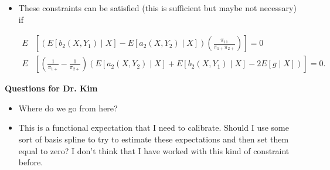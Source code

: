\documentclass[12pt]{article}
\begin{document}
\begin{itemize}
  \item These constraints can be satisfied (this is sufficient but maybe not
    necessary) if 

    \begin{align*}
      E&\left[(E[b_2(X, Y_1) \mid X] - E[a_2(X, Y_2) \mid X])
      \left(\frac{\pi_{11}}{\pi_{1+} \pi_{2+}}\right) \right] = 0\\
      E&\left[\left(\frac{1}{\pi_{1+}} - \frac{1}{\pi_{2+}}\right)(E[a_2(X, Y_2)
      \mid X] + E[b_2(X, Y_1) \mid X] - 2E[g \mid X])\right] = 0.
    \end{align*}

\end{itemize}

\textbf{Questions for Dr. Kim}
\begin{itemize}
  \item Where do we go from here?
  \item This is a functional expectation that I need to calibrate. Should I use
    some sort of basis spline to try to estimate these expectations and then set
    them equal to zero? I don't think that I have worked with this kind of
    constraint before.
\end{itemize}
%

\newpage

\printbibliography
\end{document}
